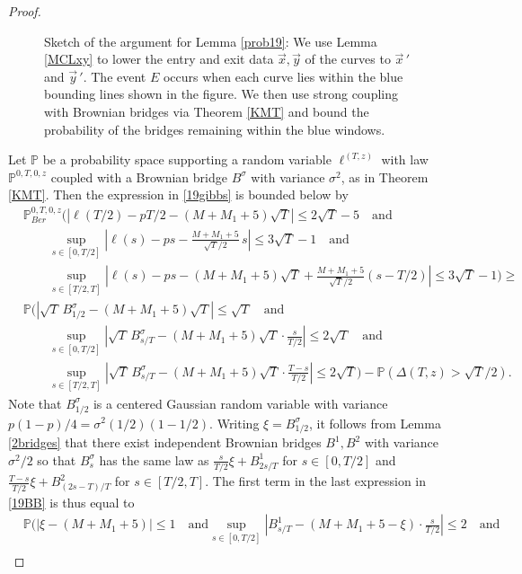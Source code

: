 \begin{proof}
\begin{figure}
	\caption{Sketch of the argument for Lemma \ref{prob19}: We use Lemma \ref{MCLxy} to lower the entry and exit data $\vec{x},\vec{y}$ of the curves to $\vec x\,'$ and $\vec y\,'$. The event $E$ occurs when each curve lies within the blue bounding lines shown in the figure. We then use strong coupling with Brownian bridges via Theorem \ref{KMT} and bound the probability of the bridges remaining within the blue windows.}
\end{figure}
	Let $\mathbb{P}$ be a probability space supporting a random variable $\ell^{(T,z)}$ with law $\mathbb{P}^{0,T,0,z}$ coupled with a Brownian bridge $B^\sigma$ with variance $\sigma^2$, as in Theorem \ref{KMT}. Then the expression in \eqref{19gibbs} is bounded below by
	\begin{equation}\label{19BB}
	\begin{split}
	& \mathbb{P}^{0,T,0,z}_{Ber}\bigg(\left|\ell(T/2)-pT/2-(M+M_1+5)\sqrt{T}\right|\leq 2\sqrt{T} - 5\quad\mathrm{and}\\
	&\qquad \sup_{s\in[0,T/2]}\left|\ell(s)-ps-\frac{M+M_1+5}{\sqrt{T}/2}\,s\right| \leq 3\sqrt{T} - 1 \quad\mathrm{and}\\
	&\qquad \sup_{s\in[T/2,T]}\left|\ell(s)-ps-(M+M_1+5)\sqrt{T}+\frac{M+M_1+5}{\sqrt{T}/2}(s-T/2)\right| \leq 3\sqrt{T} - 1 \bigg) \geq\\
	& \mathbb{P}\bigg(\left|\sqrt{T}\,B^\sigma_{1/2} - (M+M_1+5)\sqrt{T}\right|\leq \sqrt{T} \quad\mathrm{and}\\
	&\qquad\sup_{s\in[0,T/2]}\left|\sqrt{T}\,B^\sigma_{s/T}-(M+M_1+5)\sqrt{T}\cdot\frac{s}{T/2}\right| \leq 2\sqrt{T}\quad\mathrm{and}\\
	&\qquad \sup_{s\in[T/2,T]}\left|\sqrt{T}\,B^\sigma_{s/T}-(M+M_1+5)\sqrt{T}\cdot\frac{T-s}{T/2}\right| \leq 2\sqrt{T} \bigg) -  \mathbb{P}\left(\Delta(T,z) > \sqrt{T}/2\right).
	\end{split}
	\end{equation}
	Note that $B^\sigma_{1/2}$ is a centered Gaussian random variable with variance $p(1-p)/4 = \sigma^2(1/2)(1-1/2)$. Writing $\xi = B^\sigma_{1/2}$, it follows from Lemma \ref{2bridges} that there exist independent Brownian bridges $B^1,B^2$ with variance $\sigma^2/2$ so that $B^\sigma_s$ has the same law as $\frac{s}{T/2}\xi + B^1_{2s/T}$ for $s\in[0,T/2]$ and $\frac{T-s}{T/2}\xi + B^2_{(2s-T)/T}$ for $s\in[T/2,T]$. The first term in the last expression in \eqref{19BB} is thus equal to
	\begin{equation}\label{prob19split}
	\begin{split}
	&\mathbb{P}\bigg(|\xi - (M+M_1+5)|\leq 1 \quad\mathrm{and} \sup_{s\in[0,T/2]}\left|B^1_{s/T}-(M+M_1+5-\xi)\cdot\frac{s}{T/2}\right| \leq 2 \quad \mathrm{and}\\

\end{split}
\end{equation}
\end{proof}
